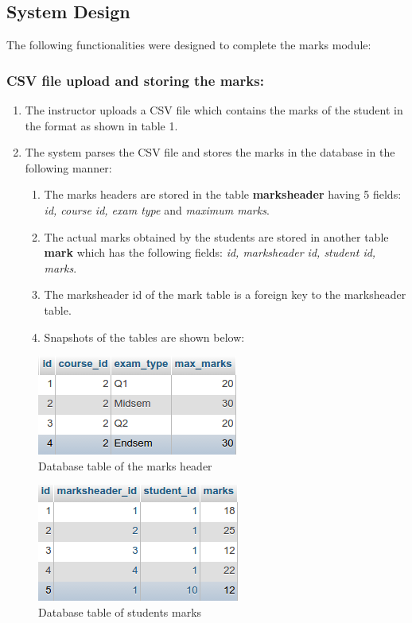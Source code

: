 \subsection{System Design}

The following functionalities were designed to complete the marks module:

\subsubsection*{CSV file upload and storing the marks:}

\begin{enumerate}
	\item The instructor uploads a CSV file which contains the marks of the student in the format as shown in table 1.
	\item The system parses the CSV file and stores the marks in the database in the following manner:
	\begin{enumerate}
		\item The marks headers are stored in the table \textbf{marksheader} having 5 fields: \textit{id, course id, exam type} and \textit{maximum marks}.
		\item The actual marks obtained by the students are stored in another table \textbf{mark} which has the following fields: \textit{id, marksheader id, student id, marks}.
		\item The marksheader id of the mark table is a foreign key to the marksheader table.
		\item Snapshots of the tables are shown below:
	\end{enumerate}
\end{enumerate}
\newpage		
	\begin{figure}[h]
	\centering
	\includegraphics[width=0.4\linewidth]{./media/MarksHeader}
	\caption{Database table of the marks header}
	\label{fig:MarksHeader}
	\end{figure}
	\begin{figure}[h]
	\centering
	\includegraphics[width=0.4\linewidth]{./media/mark}
	\caption{Database table of students marks}
	\label{fig:mark}
	\end{figure}

